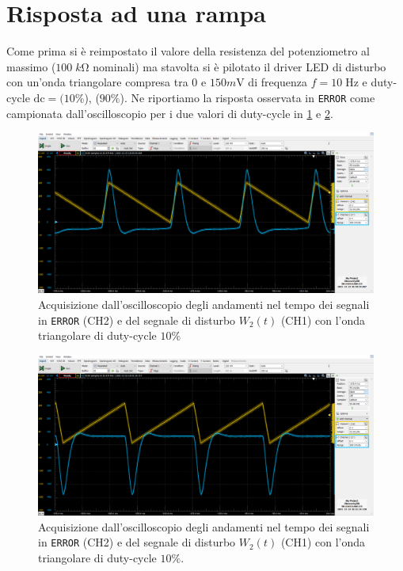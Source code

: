 \documentclass[10pt, a4paper, italian]{article}
\begin{document}
\section{Risposta ad una rampa}
Come prima si è reimpostato il valore della resistenza del potenziometro al
massimo ($100 \; \si{k\ohm}$ nominali) ma stavolta si è pilotato il driver LED
di disturbo con un'onda triangolare compresa tra $0$ e $150 \si{m\V}$ di
frequenza $f = 10 \; \si{\Hz}$ e duty-cycle $\text{dc} = (10 \percent$),
($90 \percent$). Ne riportiamo la risposta osservata in \verb+ERROR+ come
campionata dall'oscilloscopio per i due valori di duty-cycle in
\cref{fig: erramp10} e \cref{fig: erramp90}.
\begin{figure}[htbp]
    \centering
	\includegraphics[width=\textwidth]{8}
    \caption{Acquisizione dall'oscilloscopio degli andamenti nel tempo dei
    segnali in \texttt{ERROR} (CH2) e del segnale di disturbo $W_2 (t)$ (CH1)
    con l'onda triangolare di duty-cycle $10 \percent$
    \label{fig: erramp10}}
\end{figure}
\begin{figure}[htbp]
    \centering
	\includegraphics[width=\textwidth]{8.1}
    \caption{Acquisizione dall'oscilloscopio degli andamenti nel tempo dei
    segnali in \texttt{ERROR} (CH2) e del segnale di disturbo $W_2 (t)$ (CH1)
    con l'onda triangolare di duty-cycle $10 \percent$.
    \label{fig: erramp90}}
\end{figure}
\end{document}
